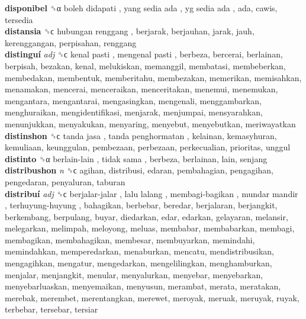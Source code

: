 \textbf{disponibel} ␝α   boleh didapati ,  yang sedia ada ,  yg sedia ada , ada, cawis, tersedia  \\
\textbf{distansia} ␝ϲ   hubungan renggang , berjarak, berjauhan, jarak, jauh, kerenggangan, perpisahan, renggang  \\
\textbf{distinguí} \emph{adj}  ␝ϲ   kenal pasti ,  mengenal pasti , berbeza, bercerai, berlainan, berpisah, bezakan, kenal, melukiskan, memanggil, membatasi, membeberkan, membedakan, membentuk, memberitahu, membezakan, memerikan, memisahkan, menamakan, mencerai, menceraikan, menceritakan, menemui, menemukan, mengantara, mengantarai, mengasingkan, mengenali, menggambarkan, menghuraikan, mengidentifikasi, menjarak, menjumpai, mensyarahkan, menunjukkan, menyakukan, menyaring, menyebut, menyebutkan, meriwayatkan  \\
\textbf{distinshon} ␝ϲ   tanda jasa ,  tanda penghormatan , kelainan, kemasyhuran, kemuliaan, keunggulan, pembezaan, perbezaan, perkecualian, prioritas, unggul  \\
\textbf{distinto} ␝α   berlain-lain ,  tidak sama , berbeza, berlainan, lain, senjang  \\
\textbf{distribushon} \emph{n}  ␝ϲ  agihan, distribusi, edaran, pembahagian, pengagihan, pengedaran, penyaluran, taburan  \\
\textbf{distribuí} \emph{adj}  ␝ϲ   berjalar-jalar ,  lalu lalang ,  membagi-bagikan ,  mundar mandir ,  terhuyung-huyung , bahagikan, berbebar, beredar, berjalaran, berjangkit, berkembang, berpulang, buyar, diedarkan, edar, edarkan, gelayaran, melansir, melegarkan, melimpah, meloyong, meluas, membabar, membabarkan, membagi, membagikan, membahagikan, membesar, membuyarkan, memindahi, memindahkan, memperedarkan, menaburkan, mencatu, mendistribusikan, mengagihkan, mengatur, mengedarkan, mengelilingkan, menghamburkan, menjalar, menjangkit, menular, menyalurkan, menyebar, menyebarkan, menyebarluaskan, menyemaikan, menyusun, merambat, merata, meratakan, merebak, merembet, merentangkan, merewet, meroyak, meruak, meruyak, ruyak, terbebar, tersebar, tersiar  \\
